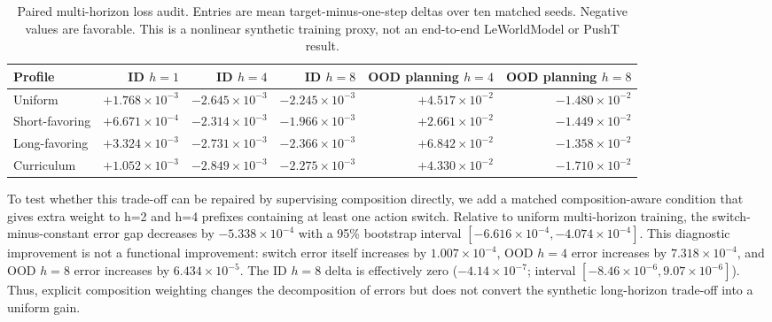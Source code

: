\documentclass{article}
\begin{document}
\begin{table}[H]
\centering
\scriptsize
\setlength{\tabcolsep}{4pt}
\caption{Paired multi-horizon loss audit. Entries are mean target-minus-one-step
deltas over ten matched seeds. Negative values are favorable. This is a
nonlinear synthetic training proxy, not an end-to-end LeWorldModel or PushT
result.}
\label{tab:supp-deep-multihorizon}
\begin{tabular}{lrrrrr}
\toprule
Profile & ID $h=1$ & ID $h=4$ & ID $h=8$ & OOD planning $h=4$ & OOD planning $h=8$ \\
\midrule
Uniform & $+1.768\times10^{-3}$ & $-2.645\times10^{-3}$ & $-2.245\times10^{-3}$ & $+4.517\times10^{-2}$ & $-1.480\times10^{-2}$ \\
Short-favoring & $+6.671\times10^{-4}$ & $-2.314\times10^{-3}$ & $-1.966\times10^{-3}$ & $+2.661\times10^{-2}$ & $-1.449\times10^{-2}$ \\
Long-favoring & $+3.324\times10^{-3}$ & $-2.731\times10^{-3}$ & $-2.366\times10^{-3}$ & $+6.842\times10^{-2}$ & $-1.358\times10^{-2}$ \\
Curriculum & $+1.052\times10^{-3}$ & $-2.849\times10^{-3}$ & $-2.275\times10^{-3}$ & $+4.330\times10^{-2}$ & $-1.710\times10^{-2}$ \\
\bottomrule
\end{tabular}
\end{table}

To test whether this trade-off can be repaired by supervising composition
directly, we add a matched composition-aware condition that gives extra weight
to h=2 and h=4 prefixes containing at least one action switch. Relative to
uniform multi-horizon training, the switch-minus-constant error gap decreases
by $-5.338\times10^{-4}$ with a 95\% bootstrap interval
$[-6.616\times10^{-4},-4.074\times10^{-4}]$. This diagnostic improvement is
not a functional improvement: switch error itself increases by
$1.007\times10^{-4}$, OOD $h=4$ error increases by
$7.318\times10^{-4}$, and OOD $h=8$ error increases by
$6.434\times10^{-5}$. The ID $h=8$ delta is effectively zero
($-4.14\times10^{-7}$; interval $[-8.46\times10^{-6},9.07\times10^{-6}]$).
Thus, explicit composition weighting changes the decomposition of errors but
does not convert the synthetic long-horizon trade-off into a uniform gain.
\end{document}

